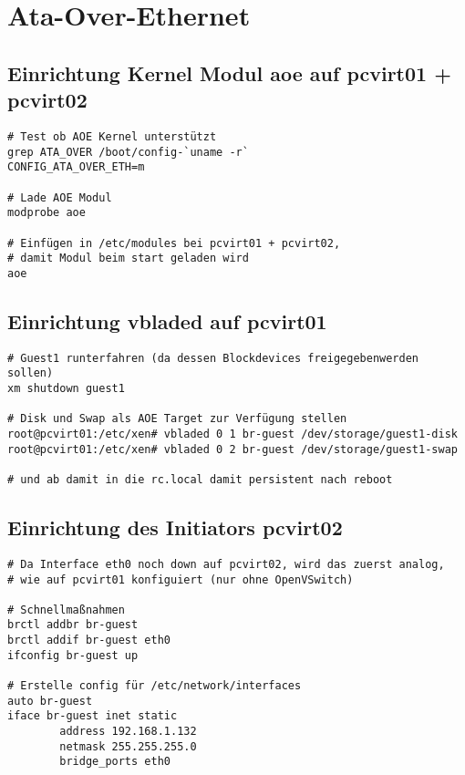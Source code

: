 \chapter{Ata-Over-Ethernet}

\section{Einrichtung Kernel Modul aoe auf pcvirt01 + pcvirt02}
\setupVerbatimOut

\begin{verbatim}
# Test ob AOE Kernel unterstützt
grep ATA_OVER /boot/config-`uname -r`
CONFIG_ATA_OVER_ETH=m

# Lade AOE Modul
modprobe aoe

# Einfügen in /etc/modules bei pcvirt01 + pcvirt02,
# damit Modul beim start geladen wird
aoe
\end{verbatim}

\section{Einrichtung vbladed auf pcvirt01}

\setupVerbatimOut
\begin{verbatim}
# Guest1 runterfahren (da dessen Blockdevices freigegebenwerden sollen)
xm shutdown guest1

# Disk und Swap als AOE Target zur Verfügung stellen
root@pcvirt01:/etc/xen# vbladed 0 1 br-guest /dev/storage/guest1-disk  
root@pcvirt01:/etc/xen# vbladed 0 2 br-guest /dev/storage/guest1-swap

# und ab damit in die rc.local damit persistent nach reboot
\end{verbatim}

\section{Einrichtung des Initiators pcvirt02}

\setupVerbatimOut
\begin{verbatim}
# Da Interface eth0 noch down auf pcvirt02, wird das zuerst analog,
# wie auf pcvirt01 konfiguiert (nur ohne OpenVSwitch)

# Schnellmaßnahmen
brctl addbr br-guest
brctl addif br-guest eth0
ifconfig br-guest up

# Erstelle config für /etc/network/interfaces 
auto br-guest
iface br-guest inet static
        address 192.168.1.132
        netmask 255.255.255.0
        bridge_ports eth0
\end{verbatim}

